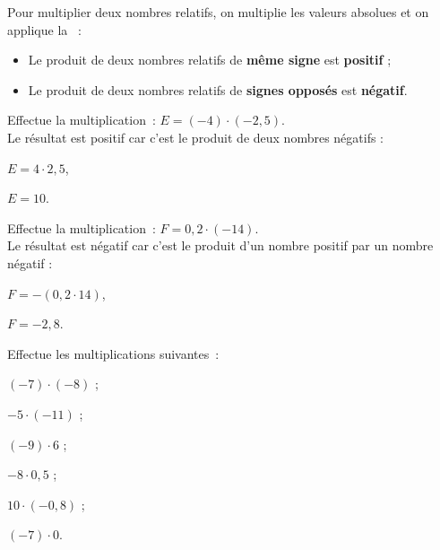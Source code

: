 

\begin{aconnaitre}
Pour multiplier deux nombres relatifs, on multiplie les valeurs absolues et on applique la  :
\begin{itemize}
 \item Le produit de deux nombres relatifs de \textbf{même signe} est \textbf{positif} ;
 \item Le produit de deux nombres relatifs de \textbf{signes opposés} est \textbf{négatif}.
 \end{itemize}
\end{aconnaitre}

\begin{methode*1}

 \begin{exemple*1}
Effectue la multiplication : $E = (- 4) \cdot (- 2,5)$. \\[0.5em]
Le résultat est positif car c'est le produit de deux nombres négatifs :

$E = 4 \cdot 2,5$,

$E = 10$.
 \end{exemple*1}

 \begin{exemple*1}
Effectue la multiplication : $F = 0,2 \cdot (- 14)$. \\[0.5em]
Le résultat est négatif car c'est le produit d'un nombre positif par un nombre négatif :

$F = - (0,2 \cdot 14)$,

$F = - 2,8$.
 \end{exemple*1}

 \exercice  
Effectue les multiplications suivantes :
\begin{colenumerate}{3}
 \item $(- 7) \cdot (- 8)$ ;
 \item $- 5 \cdot (- 11)$ ;
 \item $(- 9) \cdot 6$ ;
 \item $- 8 \cdot 0,5$ ;
 \item $10 \cdot (- 0,8)$ ;
 \item $(- 7) \cdot 0$.
 \end{colenumerate}

 \end{methode*1}
 
